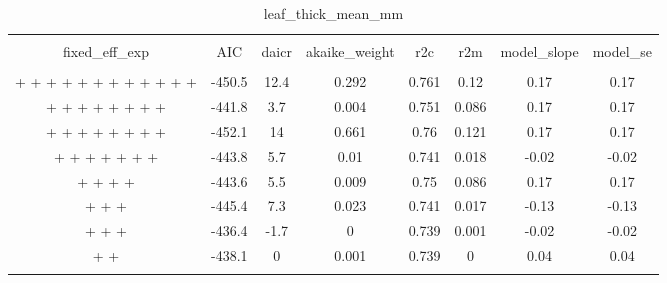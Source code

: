 
\begin{table}[!htbp] \centering 
  \caption{leaf_thick_mean_mm} 
  \label{leaf_thick_mean_mm} 
\begin{tabular}{@{\extracolsep{5pt}} cccccccc} 
\\[-1.8ex]\hline 
\hline \\[-1.8ex] 
fixed\_eff\_exp & AIC & daicr & akaike\_weight & r2c & r2m & model\_slope & model\_se \\ 
\hline \\[-1.8ex] 
 +  +  +  +  +  +  +  +  +  +  +  +  & -450.5 & 12.4 & 0.292 & 0.761 & 0.12 & 0.17 & 0.17 \\ 
 +  +  +  +  +  +  +  +  & -441.8 & 3.7 & 0.004 & 0.751 & 0.086 & 0.17 & 0.17 \\ 
 +  +  +  +  +  +  +  +  & -452.1 & 14 & 0.661 & 0.76 & 0.121 & 0.17 & 0.17 \\ 
 +  +  +  +  +  +  +  & -443.8 & 5.7 & 0.01 & 0.741 & 0.018 & -0.02 & -0.02 \\ 
 +  +  +  +  & -443.6 & 5.5 & 0.009 & 0.75 & 0.086 & 0.17 & 0.17 \\ 
 +  +  +  & -445.4 & 7.3 & 0.023 & 0.741 & 0.017 & -0.13 & -0.13 \\ 
 +  +  +  & -436.4 & -1.7 & 0 & 0.739 & 0.001 & -0.02 & -0.02 \\ 
 +  +  & -438.1 & 0 & 0.001 & 0.739 & 0 & 0.04 & 0.04 \\ 
\hline \\[-1.8ex] 
\end{tabular} 
\end{table} 

